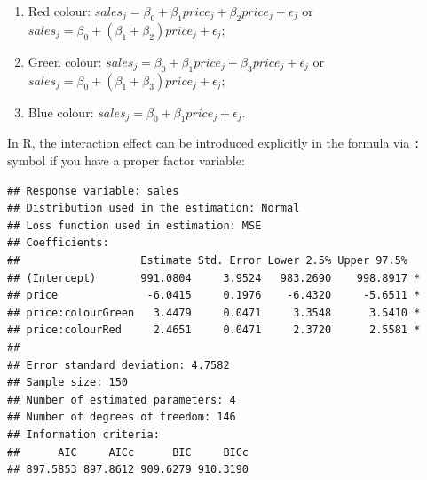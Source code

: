 \documentclass[
]{book}
\newenvironment{Shaded}{\begin{snugshade}}{\end{snugshade}}
\newcommand{\CommentTok}[1]{\textcolor[rgb]{0.56,0.35,0.01}{\textit{#1}}}
\newcommand{\DataTypeTok}[1]{\textcolor[rgb]{0.13,0.29,0.53}{#1}}
\newcommand{\DecValTok}[1]{\textcolor[rgb]{0.00,0.00,0.81}{#1}}
\newcommand{\KeywordTok}[1]{\textcolor[rgb]{0.13,0.29,0.53}{\textbf{#1}}}
\newcommand{\NormalTok}[1]{#1}
\newcommand{\OperatorTok}[1]{\textcolor[rgb]{0.81,0.36,0.00}{\textbf{#1}}}
\newcommand{\StringTok}[1]{\textcolor[rgb]{0.31,0.60,0.02}{#1}}
\providecommand{\tightlist}{%
  \setlength{\itemsep}{0pt}\setlength{\parskip}{0pt}}
\theoremstyle{definition}
\theoremstyle{definition}
\theoremstyle{definition}
\theoremstyle{definition}
\theoremstyle{remark}
\begin{document}
\begin{enumerate}
\def\labelenumi{\arabic{enumi}.}
\tightlist
\item
  Red colour: \(sales_j = \beta_0 + \beta_1 price_j + \beta_2 price_j + \epsilon_j\) or \(sales_j = \beta_0 + (\beta_1 + \beta_2) price_j + \epsilon_j\);
\item
  Green colour: \(sales_j = \beta_0 + \beta_1 price_j + \beta_3 price_j + \epsilon_j\) or \(sales_j = \beta_0 + (\beta_1 + \beta_3) price_j + \epsilon_j\);
\item
  Blue colour: \(sales_j = \beta_0 + \beta_1 price_j + \epsilon_j\).
\end{enumerate}

In R, the interaction effect can be introduced explicitly in the formula via \texttt{:} symbol if you have a proper factor variable:

\begin{Shaded}
\end{Shaded}

\begin{verbatim}
## Response variable: sales
## Distribution used in the estimation: Normal
## Loss function used in estimation: MSE
## Coefficients:
##                   Estimate Std. Error Lower 2.5% Upper 97.5%  
## (Intercept)       991.0804     3.9524   983.2690    998.8917 *
## price              -6.0415     0.1976    -6.4320     -5.6511 *
## price:colourGreen   3.4479     0.0471     3.3548      3.5410 *
## price:colourRed     2.4651     0.0471     2.3720      2.5581 *
## 
## Error standard deviation: 4.7582
## Sample size: 150
## Number of estimated parameters: 4
## Number of degrees of freedom: 146
## Information criteria:
##      AIC     AICc      BIC     BICc 
## 897.5853 897.8612 909.6279 910.3190
\end{verbatim}
\end{document}
